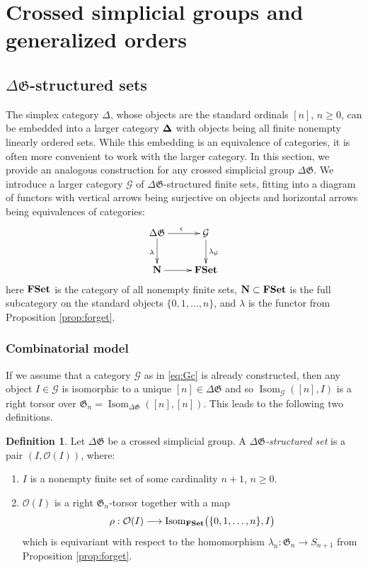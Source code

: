 \documentclass[english,11pt,leqno]{article}
\def\Gen{\mathfrak{G}}
\def\Gc{\mathcal{G}}
\def\Oc{\mathcal{O}}
\def\on{\operatorname}
\def\lra{\longrightarrow}
\def\G{ {\mathcal G}}
\def\Isom{\on{Isom}}
\def\DG{ {\Delta \Gen}}
\def\FSet{{\bf FSet}}
\theoremstyle{definition}
\newtheorem{defi}[thm]{Definition}
\theoremstyle{remark}
\numberwithin{equation}{section}
\begin{document}
\newpage
\section{Crossed simplicial groups and generalized orders}\label{sec:order} 

\subsection{$\DG$-structured sets}
   
The simplex category $\Delta$, whose objects are the standard ordinals $[n]$, $n\geq 0$,  can be embedded
into a larger category ${\bf \Delta}$ with objects being all finite nonempty linearly ordered sets.
While this embedding is an equivalence of categories, it is often more convenient to work with the
larger category. In this section, we provide an analogous construction for any crossed simplicial
group $\DG$. We introduce a larger category $\G$ of $\DG$-structured finite sets, fitting into a diagram
of functors with vertical arrows being surjective on objects and horizontal arrows being
equivalences of categories:
\begin{equation}
	\label{eq:Gc}
	\xymatrix{
		\DG \ar[d]_\lambda  \ar[r]^\epsilon& \G \ar[d]^{\lambda_{\G}}\\
		{\bf N}\ar[r]& \FSet
	}
\end{equation}
here $\FSet$ is the category of all nonempty finite sets, $\bf N \subset \FSet$ is the full
subcategory on the standard objects $\{0,1,\dots, n\}$, and $\lambda$ is the functor from
Proposition \ref {prop:forget}. 
 
\subsubsection{Combinatorial model}
\label{sec:combmodel} 
  
If we assume that a category $\Gc$ as in \eqref{eq:Gc} is already constructed, then any object
$I\in\Gc$ is isomorphic to a unique $[n]\in\DG$ and so $\Isom_\Gc([n], I)$ is a right torsor over
$\Gen_n=\Isom_\DG([n], [n])$. This leads to the following two definitions. 
 
\begin{defi}
Let $\DG$ be a crossed simplicial group. A {\em $\DG$-structured set} is a pair $(I, \Oc(I))$, where:
\begin{enumerate}
\item[(1)] $I$ is  a nonempty finite set of some cardinality $n+1$, $n\geq 0$. 
\item[(2)] $\Oc(I)$ is a right $\Gen_n$-torsor together with a map
\[
\rho: \Oc(I) \lra \Isom_{\FSet}\bigl( \{0,1,\dots, n\}, I \bigr)
\]
which is equivariant with respect to the homomorphism $\lambda_n: \Gen_n\to S_{n+1}$
from Proposition \ref {prop:forget}.
\end{enumerate}
\end{defi}
\end{document}
